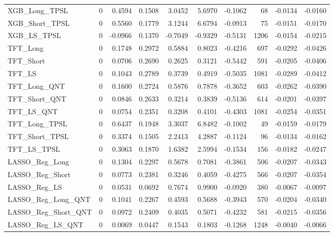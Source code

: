 \begin{tabular}{llrrrrrrrr}
\cline{1-10}
XGB\_Long\_TPSL & 0 & 0.4594 & 0.1508 & 3.0452 & 5.6970 & -0.1062 & 68 & -0.0134 & -0.0160 \\
\cline{1-10}
XGB\_Short\_TPSL & 0 & 0.5560 & 0.1779 & 3.1244 & 6.6794 & -0.0913 & 75 & -0.0151 & -0.0170 \\
\cline{1-10}
XGB\_LS\_TPSL & 0 & -0.0966 & 0.1370 & -0.7049 & -0.9329 & -0.5131 & 1206 & -0.0154 & -0.0215 \\
\cline{1-10}
TFT\_Long & 0 & 0.1748 & 0.2972 & 0.5884 & 0.8023 & -0.4216 & 697 & -0.0292 & -0.0426 \\
\cline{1-10}
TFT\_Short & 0 & 0.0706 & 0.2690 & 0.2625 & 0.3121 & -0.5442 & 591 & -0.0205 & -0.0406 \\
\cline{1-10}
TFT\_LS & 0 & 0.1043 & 0.2789 & 0.3739 & 0.4919 & -0.5035 & 1081 & -0.0289 & -0.0412 \\
\cline{1-10}
TFT\_Long\_QNT & 0 & 0.1600 & 0.2724 & 0.5876 & 0.7878 & -0.3652 & 603 & -0.0262 & -0.0390 \\
\cline{1-10}
TFT\_Short\_QNT & 0 & 0.0846 & 0.2633 & 0.3214 & 0.3839 & -0.5136 & 614 & -0.0201 & -0.0397 \\
\cline{1-10}
TFT\_LS\_QNT & 0 & 0.0754 & 0.2351 & 0.3208 & 0.4101 & -0.4303 & 1081 & -0.0254 & -0.0351 \\
\cline{1-10}
TFT\_Long\_TPSL & 0 & 0.6437 & 0.1948 & 3.3037 & 6.8482 & -0.1002 & 49 & -0.0159 & -0.0179 \\
\cline{1-10}
TFT\_Short\_TPSL & 0 & 0.3374 & 0.1505 & 2.2413 & 4.2887 & -0.1124 & 96 & -0.0134 & -0.0162 \\
\cline{1-10}
TFT\_LS\_TPSL & 0 & 0.3063 & 0.1870 & 1.6382 & 2.5994 & -0.1534 & 156 & -0.0182 & -0.0247 \\
\cline{1-10}
LASSO\_Reg\_Long & 0 & 0.1304 & 0.2297 & 0.5678 & 0.7081 & -0.3861 & 506 & -0.0207 & -0.0343 \\
\cline{1-10}
LASSO\_Reg\_Short & 0 & 0.0773 & 0.2381 & 0.3246 & 0.4059 & -0.4275 & 566 & -0.0207 & -0.0354 \\
\cline{1-10}
LASSO\_Reg\_LS & 0 & 0.0531 & 0.0692 & 0.7674 & 0.9900 & -0.0920 & 380 & -0.0067 & -0.0097 \\
\cline{1-10}
LASSO\_Reg\_Long\_QNT & 0 & 0.1041 & 0.2267 & 0.4593 & 0.5688 & -0.3943 & 570 & -0.0204 & -0.0340 \\
\cline{1-10}
LASSO\_Reg\_Short\_QNT & 0 & 0.0972 & 0.2409 & 0.4035 & 0.5071 & -0.4232 & 581 & -0.0215 & -0.0356 \\
\cline{1-10}
LASSO\_Reg\_LS\_QNT & 0 & 0.0069 & 0.0447 & 0.1543 & 0.1803 & -0.1268 & 1248 & -0.0040 & -0.0066 \\

\end{tabular}
